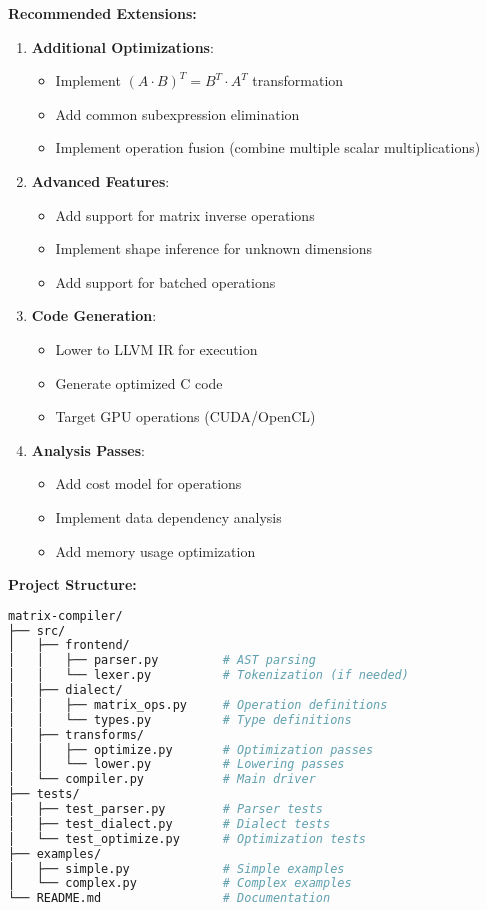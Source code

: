 \documentclass[11pt,a4paper]{article}
\begin{document}
\textbf{Recommended Extensions:}
\begin{enumerate}
    \item \textbf{Additional Optimizations}:
    \begin{itemize}
        \item Implement $(A \cdot B)^T = B^T \cdot A^T$ transformation
        \item Add common subexpression elimination
        \item Implement operation fusion (combine multiple scalar multiplications)
    \end{itemize}
    
    \item \textbf{Advanced Features}:
    \begin{itemize}
        \item Add support for matrix inverse operations
        \item Implement shape inference for unknown dimensions
        \item Add support for batched operations
    \end{itemize}
    
    \item \textbf{Code Generation}:
    \begin{itemize}
        \item Lower to LLVM IR for execution
        \item Generate optimized C code
        \item Target GPU operations (CUDA/OpenCL)
    \end{itemize}
    
    \item \textbf{Analysis Passes}:
    \begin{itemize}
        \item Add cost model for operations
        \item Implement data dependency analysis
        \item Add memory usage optimization
    \end{itemize}
\end{enumerate}

\textbf{Project Structure:}
\begin{lstlisting}[language=bash, caption=Recommended project organization]
matrix-compiler/
├── src/
│   ├── frontend/
│   │   ├── parser.py         # AST parsing
│   │   └── lexer.py          # Tokenization (if needed)
│   ├── dialect/
│   │   ├── matrix_ops.py     # Operation definitions
│   │   └── types.py          # Type definitions
│   ├── transforms/
│   │   ├── optimize.py       # Optimization passes
│   │   └── lower.py          # Lowering passes
│   └── compiler.py           # Main driver
├── tests/
│   ├── test_parser.py        # Parser tests
│   ├── test_dialect.py       # Dialect tests
│   └── test_optimize.py      # Optimization tests
├── examples/
│   ├── simple.py             # Simple examples
│   └── complex.py            # Complex examples
└── README.md                 # Documentation
\end{lstlisting}
\end{document}
